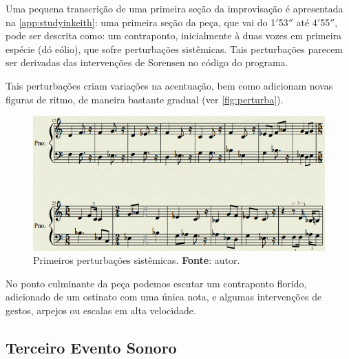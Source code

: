Uma pequena transcrição de uma primeira seção da improvisação é apresentada na \autoref{app:studyinkeith}: uma primeira seção da peça, que vai do 1$'$53$''$ até 4$'$55$''$, pode ser descrita como: um contraponto, inicialmente à duas vozes em primeira espécie (dó eólio), que sofre perturbações sistêmicas. Tais perturbações parecem ser derivadas das intervenções de Sorensen no código do programa.

Tais perturbações criam variações na acentuação, bem como adicionam novas figuras de ritmo, de maneira bastante gradual (ver \autoref{fig:perturba}).

\begin{figure}[!h]
  \centering
  \includegraphics[scale=0.5]{imagens/SIK_perturba.png}
  \caption{Primeiros perturbações sistêmicas. \textbf{Fonte}: autor.}
  \label{fig:SIKinicio}
\end{figure}

No ponto culminante da peça podemos escutar um contraponto florido, adicionado de um ostinato com uma única nota, e algumas intervenções de gestos, arpejos ou escalas em alta velocidade.


\subsection{Terceiro Evento Sonoro}\label{sec:terceiro evento}